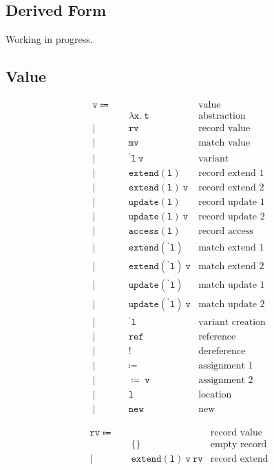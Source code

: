 \documentclass{report}
\newcommand{\code}{\mathtt}
\newcommand{\backtick}{{}^{\backprime}}
\begin{document}
\subsection{Derived Form}

Working in progress.

\subsection{Value}

\begin{align*}
\code{v} \Coloneqq \quad & & \text{value} \\
& \code{\lambda x.\ t} & \text{abstraction} \\
| \quad & \code{rv} & \text{record value} \\
| \quad & \code{mv} & \text{match value} \\
| \quad & \code{\backtick l\ v} & \text{variant} \\
| \quad & \code{extend(l)} & \text{record extend 1} \\
| \quad & \code{extend(l)\ v} & \text{record extend 2} \\
| \quad & \code{update(l)} & \text{record update 1} \\
| \quad & \code{update(l)\ v} & \text{record update 2} \\
| \quad & \code{access(l)} & \text{record access} \\
| \quad & \code{extend(\backtick l)} & \text{match extend 1} \\
| \quad & \code{extend(\backtick l)\ v} & \text{match extend 2} \\
| \quad & \code{update(\backtick l)} & \text{match update 1} \\
| \quad & \code{update(\backtick l)\ v} & \text{match update 2} \\
| \quad & \code{\backtick l} & \text{variant creation} \\
| \quad & \code{ref} & \text{reference} \\
| \quad & \code{!} & \text{dereference} \\
| \quad & \code{\coloneqq} & \text{assignment 1} \\
| \quad & \code{\coloneqq\ v} & \text{assignment 2} \\
| \quad & \code{l} & \text{location} \\
| \quad & \code{new} & \text{new}
\end{align*}

\begin{align*}
\code{rv} \Coloneqq \quad & & \text{record value} \\
& \code{\{\}} & \text{empty record} \\
| \quad & \code{extend(l)\ v\ rv} & \text{record extend}
\end{align*}
\end{document}
